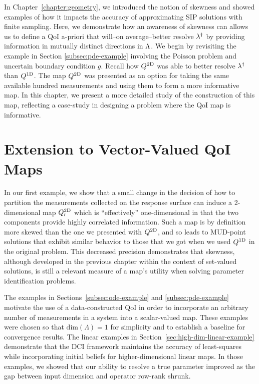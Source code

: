 
In Chapter~\ref{chapter:geometry}, we introduced the notion of skewness and showed examples of how it impacts the accuracy of approximating SIP solutions with finite sampling.
Here, we demonstrate how an awareness of skewness can allows us to define a QoI a-priori that will\---on average\---better resolve $\lambda^\dagger$ by providing information in mutually distinct directions in ${\Lambda}$.
We begin by revisiting the example in Section \ref{subsec:pde-example} involving the Poisson problem and uncertain boundary condition $g$.
Recall how $Q^\text{2D}$ was able to better resolve $\lambda^\dagger$ than $Q^\text{1D}$.
The map $Q^\text{2D}$ was presented as an option for taking the same available hundred measurements and using them to form a more informative map.
In this chapter, we present a more detailed study of the construction of this map, reflecting a case-study in designing a problem where the QoI map is informative.

\section{Extension to Vector-Valued QoI Maps}
In our first example, we show that a small change in the decision of how to partition the measurements collected on the response surface can induce a 2-dimensional map $Q^\text{2D}_\prime$ which is ``effectively'' one-dimensional in that the two components provide highly correlated information.
Such a map is by definition more skewed than the one we presented with $Q^\text{2D}$, and so leads to MUD-point solutions that exhibit similar behavior to those that we got when we used $Q^\text{1D}$ in the original problem.
This decreased precision demonstrates that skewness, although developed in the previous chapter within the context of set-valued solutions, is still a relevant measure of a map's utility when solving parameter identification problems.

The examples in Sections~\ref{subsec:ode-example} and \ref{subsec:pde-example} motivate the use of a data-constructed QoI in order to incorporate an arbitrary number of measurements in a system into a scalar-valued map.
These examples were chosen so that $\text{dim}({\Lambda}) = 1$ for simplicity and to establish a baseline for convergence results.
The linear examples in Section~\ref{sec:high-dim-linear-example} demonstrate that the DCI framework maintains the accuracy of least-squares while incorporating initial beliefs for higher-dimensional linear maps.
In those examples, we showed that our ability to resolve a true parameter improved as the gap between input dimension and operator row-rank shrunk.

